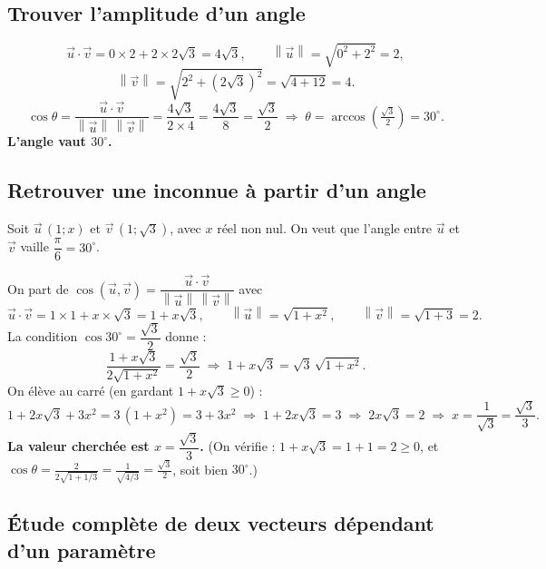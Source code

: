 \documentclass[11pt,a4paper]{article}
\providecommand{\norm}[1]{\left\lVert #1\right\rVert}
\begin{document}
\subsection{Trouver l'amplitude d'un angle}

\begin{exemple}
\[
  \vec{u}\cdot\vec{v}=0\times2+2\times2\sqrt3=4\sqrt3,\qquad
  \norm{\vec{u}}=\sqrt{0^2+2^2}=2,
\]
\[
  \norm{\vec{v}}=\sqrt{2^2+(2\sqrt3)^2}=\sqrt{4+12}=4.
\]
\[
  \cos\theta=\frac{\vec{u}\cdot\vec{v}}{\norm{\vec{u}}\,\norm{\vec{v}}}
  =\frac{4\sqrt3}{2\times4}=\frac{4\sqrt3}{8}=\frac{\sqrt3}{2}
  \;\Longrightarrow\; \theta=\arccos\!\left(\tfrac{\sqrt3}{2}\right)=30^{\circ}.
\]
\textbf{L'angle vaut $30^{\circ}$.}
\end{exemple}

\subsection{Retrouver une inconnue à partir d'un angle}

\begin{exemple}
Soit $\vec{u}\,(1;x)$ et $\vec{v}\,(1;\sqrt3)$, avec $x$ réel non nul. On veut que l'angle entre
$\vec{u}$ et $\vec{v}$ vaille $\dfrac{\pi}{6}=30^{\circ}$.

On part de $\cos(\vec u,\vec v)=\dfrac{\vec u\cdot\vec v}{\norm{\vec u}\,\norm{\vec v}}$ avec
\[
  \vec u\cdot\vec v=1\times1+x\times\sqrt3=1+x\sqrt3,\qquad
  \norm{\vec u}=\sqrt{1+x^2},\qquad
  \norm{\vec v}=\sqrt{1+3}=2.
\]
La condition $\cos 30^\circ=\dfrac{\sqrt3}{2}$ donne :
\[
  \frac{1+x\sqrt3}{2\sqrt{1+x^2}}=\frac{\sqrt3}{2}
  \;\Longrightarrow\; 1+x\sqrt3=\sqrt3\,\sqrt{1+x^2}.
\]
On élève au carré (en gardant $1+x\sqrt3\geq0$) :
\[
  1+2x\sqrt3+3x^2=3\,(1+x^2)=3+3x^2
  \;\Longrightarrow\; 1+2x\sqrt3=3
  \;\Longrightarrow\; 2x\sqrt3=2
  \;\Longrightarrow\; x=\frac{1}{\sqrt3}=\frac{\sqrt3}{3}.
\]
\textbf{La valeur cherchée est $x=\dfrac{\sqrt3}{3}$.} (On vérifie : $1+x\sqrt3=1+1=2\geq0$, et
$\cos\theta=\frac{2}{2\sqrt{1+1/3}}=\frac{1}{\sqrt{4/3}}=\frac{\sqrt3}{2}$, soit bien $30^\circ$.)
\end{exemple}

\subsection{Étude complète de deux vecteurs dépendant d'un paramètre}
\end{document}
